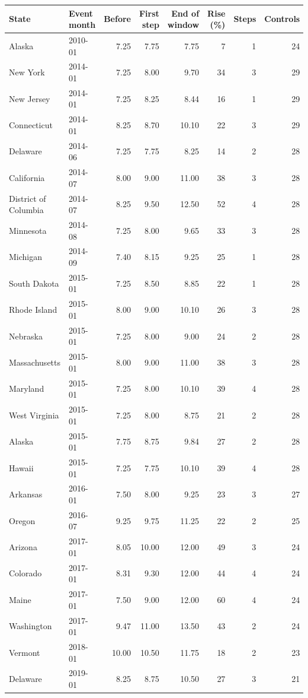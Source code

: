 \begin{tabular}{llrrrrrr}
\toprule
State & Event month & Before & First step & End of window & Rise (\%) & Steps & Controls \\
\midrule
Alaska & 2010-01 & 7.25 & 7.75 & 7.75 & 7 & 1 & 24 \\
New York & 2014-01 & 7.25 & 8.00 & 9.70 & 34 & 3 & 29 \\
New Jersey & 2014-01 & 7.25 & 8.25 & 8.44 & 16 & 1 & 29 \\
Connecticut & 2014-01 & 8.25 & 8.70 & 10.10 & 22 & 3 & 29 \\
Delaware & 2014-06 & 7.25 & 7.75 & 8.25 & 14 & 2 & 28 \\
California & 2014-07 & 8.00 & 9.00 & 11.00 & 38 & 3 & 28 \\
District of Columbia & 2014-07 & 8.25 & 9.50 & 12.50 & 52 & 4 & 28 \\
Minnesota & 2014-08 & 7.25 & 8.00 & 9.65 & 33 & 3 & 28 \\
Michigan & 2014-09 & 7.40 & 8.15 & 9.25 & 25 & 1 & 28 \\
South Dakota & 2015-01 & 7.25 & 8.50 & 8.85 & 22 & 1 & 28 \\
Rhode Island & 2015-01 & 8.00 & 9.00 & 10.10 & 26 & 3 & 28 \\
Nebraska & 2015-01 & 7.25 & 8.00 & 9.00 & 24 & 2 & 28 \\
Massachusetts & 2015-01 & 8.00 & 9.00 & 11.00 & 38 & 3 & 28 \\
Maryland & 2015-01 & 7.25 & 8.00 & 10.10 & 39 & 4 & 28 \\
West Virginia & 2015-01 & 7.25 & 8.00 & 8.75 & 21 & 2 & 28 \\
Alaska & 2015-01 & 7.75 & 8.75 & 9.84 & 27 & 2 & 28 \\
Hawaii & 2015-01 & 7.25 & 7.75 & 10.10 & 39 & 4 & 28 \\
Arkansas & 2016-01 & 7.50 & 8.00 & 9.25 & 23 & 3 & 27 \\
Oregon & 2016-07 & 9.25 & 9.75 & 11.25 & 22 & 2 & 25 \\
Arizona & 2017-01 & 8.05 & 10.00 & 12.00 & 49 & 3 & 24 \\
Colorado & 2017-01 & 8.31 & 9.30 & 12.00 & 44 & 4 & 24 \\
Maine & 2017-01 & 7.50 & 9.00 & 12.00 & 60 & 4 & 24 \\
Washington & 2017-01 & 9.47 & 11.00 & 13.50 & 43 & 2 & 24 \\
Vermont & 2018-01 & 10.00 & 10.50 & 11.75 & 18 & 2 & 23 \\
Delaware & 2019-01 & 8.25 & 8.75 & 10.50 & 27 & 3 & 21 \\

\end{tabular}

